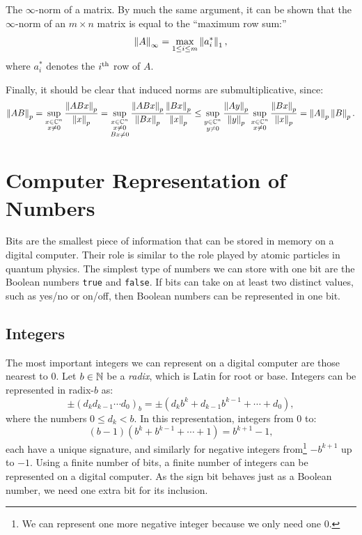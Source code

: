 \begin{example}
The $\infty$-norm of a matrix. By much the same argument, it can be shown that the $\infty$-norm of an $m\times n$ matrix is equal to the ``maximum row sum:''
\begin{equation}
\left\|{A}\right\|_\infty = \max_{1\le i\le m}\left\|{a_i^*}\right\|_1,
\end{equation}
where $a_i^*$ denotes the $i^{\rm th}$ row of $A$.
\end{example}

Finally, it should be clear that induced norms are submultiplicative, since:
\[
\left\|{AB}\right\|_p = \sup_{\substack{x\in\mathbb{C}^n\\x\ne0}}\dfrac{\left\|{ABx}\right\|_p}{\left\|{x}\right\|_p} = \sup_{\substack{x\in\mathbb{C}^n\\x\ne0\\Bx\ne0}}\dfrac{\left\|{ABx}\right\|_p}{\left\|{Bx}\right\|_p}\dfrac{\left\|{Bx}\right\|_p}{\left\|{x}\right\|_p} \le \sup_{\substack{y\in\mathbb{C}^n\\y\ne0}}\dfrac{\left\|{Ay}\right\|_p}{\left\|{y}\right\|_p}\sup_{\substack{x\in\mathbb{C}^n\\x\ne0}}\dfrac{\left\|{Bx}\right\|_p}{\left\|{x}\right\|_p} = \left\|{A}\right\|_p\left\|{B}\right\|_p.
\]

\section{Computer Representation of Numbers}

Bits are the smallest piece of information that can be stored in memory on a digital computer. Their role is similar to the role played by atomic particles in quantum physics. The simplest type of numbers we can store with one bit are the Boolean numbers \verb+true+ and \verb+false+. If bits can take on at least two distinct values, such as yes/no or on/off, then Boolean numbers can be represented in one bit.

\subsection{Integers}

The most important integers we can represent on a digital computer are those nearest to $0$. Let $b\in\mathbb{N}$ be a {\em radix}, which is Latin for root or base. Integers can be represented in radix-$b$ as:
\[
\pm(d_kd_{k-1}\cdots d_0)_b = \pm\left(d_kb^k + d_{k-1}b^{k-1} + \cdots + d_0\right),
\]
where the numbers $0\le d_k < b$. In this representation, integers from $0$ to:
\[
(b-1)(b^k+b^{k-1}+\cdots+1) = b^{k+1}-1,
\]
each have a unique signature, and similarly for negative integers from\footnote{We can represent one more negative integer because we only need one $0$.} $-b^{k+1}$ up to $-1$. Using a finite number of bits, a finite number of integers can be represented on a digital computer. As the sign bit behaves just as a Boolean number, we need one extra bit for its inclusion.

